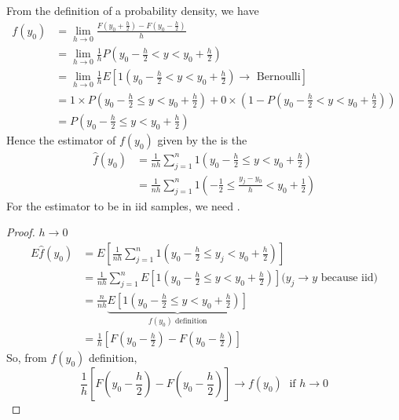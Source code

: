 From the definition of a probability density, we have
\begin{align*}
    f(y_0) & = \lim_{h\to 0}\frac{F(y_0+\frac{h}{2}) - F(y_0-\frac{h}{2})}{h}\\
    & = \lim_{h\to 0}\frac{1}{h} P(y_0-\frac{h}{2}<y<y_0+\frac{h}{2})\\
    & = \lim_{h\to 0}\frac{1}{h} E\left[1\left(y_0-\frac{h}{2}<y<y_0+\frac{h}{2}\right)\to\text{ Bernoulli}\right]\\
    & = 1\times P\left(y_0-\frac{h}{2}\leq y<y_0+\frac{h}{2}\right) + 0\times \left(1-P\left(y_0-\frac{h}{2}<y<y_0+\frac{h}{2}\right)\right)\\
    & = P\left(y_0-\frac{h}{2}\leq y<y_0+\frac{h}{2}\right)
\end{align*}
Hence the estimator of $f(y_0)$ given by the  is the 
\begin{align*}
    \hat{f}(y_0) & = \frac{1}{nh}\sum_{j=1}^{n} 1\left(y_0-\frac{h}{2}\leq y<y_0+\frac{h}{2}\right)\\
    & = \frac{1}{nh}\sum_{j=1}^{n} 1\left(-\frac{1}{2}\leq \frac{y_j-y_0}{h}<y_0+\frac{1}{2}\right)
\end{align*}
For the estimator to be  in iid samples, we need .
\begin{proof}
    $h\to 0$
    \begin{align*}
        E{\hat{f}(y_0)} & = E\left[\frac{1}{nh}\sum_{j=1}^{n} 1\left(y_0-\frac{h}{2}\leq y_j<y_0+\frac{h}{2}\right)\right]\\
        & = \frac{1}{nh}\sum_{j=1}^{n}E\left[1\left(y_0-\frac{h}{2}\leq y<y_0+\frac{h}{2}\right)\right] \text{($y_j\to y$ because iid)}\\
        & = \frac{n}{nh} \underbrace{E\left[1\left(y_0-\frac{h}{2}\leq y<y_0+\frac{h}{2}\right)\right]}_{f(y_0)\text{ definition}}\\
        & = \frac{1}{h}\left[F\left(y_0-\frac{h}{2}\right)-F(y_0-\frac{h}{2})\right]
    \end{align*}
    So, from $f(y_0)$ definition,
    \begin{equation*}
        \frac{1}{h}\left[F\left(y_0-\frac{h}{2}\right)-F(y_0-\frac{h}{2})\right] \to f(y_0) \;\text{ if } h\to 0
    \end{equation*}
\end{proof}
